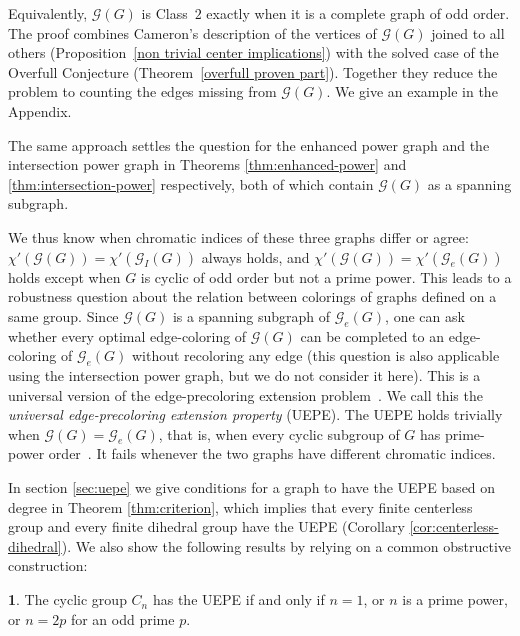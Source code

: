 \documentclass{article}
\theoremstyle{definition}
\theoremstyle{indentclaim}
\theoremstyle{named}
\theoremstyle{named}
\newcommand{\mainthmname}{}
\newtheorem*{mainthminner}{\mainthmname}
\newenvironment{mainthm}[1]
  {\renewcommand{\mainthmname}{#1}\begin{mainthminner}}
  {\end{mainthminner}}
\begin{document}
Equivalently, $\mathscr{G}(G)$ is Class~$2$ exactly when it is a complete
graph of odd order. The proof combines Cameron's description of the vertices
of $\mathscr{G}(G)$ joined to all others
(Proposition~\ref{non trivial center implications}) with the solved case of
the Overfull Conjecture (Theorem~\ref{overfull proven part}). Together they
reduce the problem to counting the edges missing from $\mathscr{G}(G)$. We give an example in the Appendix. 
 
The same approach settles the question for the enhanced power graph and the
intersection power graph in Theorems \ref{thm:enhanced-power} and \ref{thm:intersection-power} respectively, both of which contain $\mathscr{G}(G)$ as a
spanning subgraph.

\medskip

We thus know when chromatic indices of these three graphs differ or agree: $\chi'(\mathscr{G}(G)) = \chi'(\mathscr{G}_I(G))$ always holds, and $\chi'(\mathscr{G}(G)) = \chi'(\mathscr{G}_e(G))$ holds except when $G$ is cyclic of odd order but not a prime power. This leads to a robustness question about the relation between colorings of graphs defined on a same group. Since $\mathscr{G}(G)$ is a spanning subgraph
of $\mathscr{G}_{e}(G)$, one can ask whether every optimal edge-coloring of
$\mathscr{G}(G)$ can be completed to an edge-coloring of $\mathscr{G}_{e}(G)$
without recoloring any edge (this question is also applicable using the intersection power graph, but we do not consider it here). This is a universal version of the
edge-precoloring extension problem~\cite{GiraoKang2019}. We call this the \emph{universal edge-precoloring extension property} (UEPE). The UEPE holds trivially
when $\mathscr{G}(G)=\mathscr{G}_{e}(G)$, that is, when every cyclic subgroup
of $G$ has prime-power order~\cite[Theorem~28]{AalipourEtAl2017}. It fails
whenever the two graphs have different chromatic indices. 

In section \ref{sec:uepe} we give conditions for a graph to have the UEPE based on degree in Theorem \ref{thm:criterion}, which implies that every finite centerless group and every finite dihedral group have the UEPE (Corollary \ref{cor:centerless-dihedral}). We also show the following results by relying on a common obstructive construction:  

\begin{mainthm}{Theorem \ref{thm:cyclic-exact}}
    The cyclic group $C_n$ has the UEPE if and only if $n = 1$, or $n$ is a prime
power, or $n= 2p$ for an odd prime $p$.
\end{mainthm}
\end{document}
